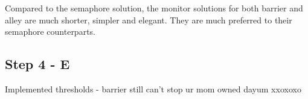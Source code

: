 Compared to the semaphore solution, the monitor solutions for both barrier and alley are much shorter, simpler and elegant. They are much preferred to their semaphore counterparts.
\subsection*{Step 4 - E}

Implemented thresholds - barrier still can't stop ur mom owned dayum xxoxoxo

